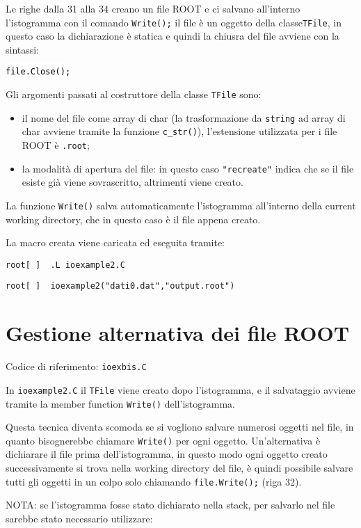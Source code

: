 \documentclass{article}
\newcommand{\ttt}{\texttt}
\newcommand{\tcpp}[1]{\hspace{10pt}\colorbox{background}{\textcolor{black}{\texttt{#1}}}}
\newcommand{\troot}[1]{\hspace{10pt}\colorbox{bashbackground}{\textcolor{bashtext}{\texttt{root[~]~~#1}}}}
\begin{document}
Le righe dalla 31 alla 34 creano un file ROOT e ci salvano all'interno l'istogramma con il comando \ttt{Write();}
il file è un oggetto della classe\ttt{TFile}, in questo caso la dichiarazione è statica e quindi la chiusra del file avviene con la sintassi:

\tcpp{file.Close();}

Gli argomenti passati al costruttore della classe \ttt{TFile} sono:
\begin{itemize}
    \item il nome del file come array di char (la trasformazione da \ttt{string} ad array di char avviene tramite la funzione \ttt{c\_str()}), l'estensione utilizzata per i file ROOT è \ttt{.root};
    \item la modalità di apertura del file: in questo caso \ttt{"recreate"} indica che se il file esiste già viene sovrascritto, altrimenti viene creato.
\end{itemize}

La funzione \ttt{Write()} salva automaticamente l'istogramma all'interno della current working directory, che in questo caso è il file appena creato.


La macro creata viene caricata ed eseguita tramite:

\vspace{5pt}

\troot{.L ioexample2.C}

\troot{ioexample2("dati0.dat","output.root")}
\vspace{5pt}


\section{Gestione alternativa dei file ROOT}
Codice di riferimento: \ttt{ioexbis.C} \vspace{10pt}

In \ttt{ioexample2.C} il \ttt{TFile} viene creato dopo l'istogramma, e il salvataggio avviene tramite la member function \ttt{Write()} dell'istogramma.

Questa tecnica diventa scomoda se si vogliono salvare numerosi oggetti nel file, in quanto bisognerebbe chiamare \ttt{Write()} per ogni oggetto.
Un'alternativa è dichiarare il file prima dell'istogramma, in questo modo ogni oggetto creato successivamente si trova nella working directory del file,
è quindi possibile salvare tutti gli oggetti in un colpo solo chiamando \ttt{file.Write();} (riga 32).

NOTA: se l'istogramma fosse stato dichiarato nella stack, per salvarlo nel file sarebbe stato necessario utilizzare:
\end{document}
